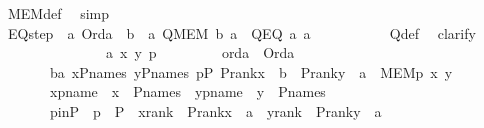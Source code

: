 \begin{isabellebody}
\ MEM{\isacharunderscore}{\kern0pt}def\ \isamarkupfalse%
\ simp\ \isanewline
\ \ \ \ \isamarkupfalse%
\isanewline
\isanewline
\ \ \ \ \isamarkupfalse%
\ EQ{\isacharunderscore}{\kern0pt}step\ {\isacharcolon}{\kern0pt}\ {\isachardoublequoteopen}{\isasymAnd}a{\isachardot}{\kern0pt}\ Ord{\isacharparenleft}{\kern0pt}a{\isacharparenright}{\kern0pt}\ {\isasymLongrightarrow}\ {\isasymforall}b\ {\isasymin}\ a{\isachardot}{\kern0pt}\ Q{\isacharparenleft}{\kern0pt}MEM{\isacharcomma}{\kern0pt}\ b{\isacharcomma}{\kern0pt}\ a{\isacharparenright}{\kern0pt}\ {\isasymLongrightarrow}\ Q{\isacharparenleft}{\kern0pt}EQ{\isacharcomma}{\kern0pt}\ a{\isacharcomma}{\kern0pt}\ a{\isacharparenright}{\kern0pt}{\isachardoublequoteclose}\ \ \ \isanewline
\ \ \ \ \ \ \isamarkupfalse%
\ Q{\isacharunderscore}{\kern0pt}def\ \isamarkupfalse%
\ clarify\ \isanewline
\ \ \ \ \isamarkupfalse%
\ {\isacharminus}{\kern0pt}\ \isanewline
\ \ \ \ \ \ \isamarkupfalse%
\ a\ x\ y\ p\ \isanewline
\ \ \ \ \ \ \isamarkupfalse%
\ orda\ {\isacharcolon}{\kern0pt}\ {\isachardoublequoteopen}Ord{\isacharparenleft}{\kern0pt}a{\isacharparenright}{\kern0pt}{\isachardoublequoteclose}\ \isanewline
\ \ \ \ \ \ \ {\isachardoublequoteopen}{\isasymforall}b{\isasymin}a{\isachardot}{\kern0pt}\ {\isasymforall}x{\isasymin}P{\isacharunderscore}{\kern0pt}names{\isachardot}{\kern0pt}\ {\isasymforall}y{\isasymin}P{\isacharunderscore}{\kern0pt}names{\isachardot}{\kern0pt}\ {\isasymforall}p{\isasymin}P{\isachardot}{\kern0pt}\ P{\isacharunderscore}{\kern0pt}rank{\isacharparenleft}{\kern0pt}x{\isacharparenright}{\kern0pt}\ {\isasymle}\ b\ {\isasymlongrightarrow}\ P{\isacharunderscore}{\kern0pt}rank{\isacharparenleft}{\kern0pt}y{\isacharparenright}{\kern0pt}\ {\isasymle}\ a\ {\isasymlongrightarrow}\ MEM{\isacharparenleft}{\kern0pt}p{\isacharcomma}{\kern0pt}\ x{\isacharcomma}{\kern0pt}\ y{\isacharparenright}{\kern0pt}{\isachardoublequoteclose}\ \isanewline
\ \ \ \ \ \ \ xpname\ {\isacharcolon}{\kern0pt}\ {\isachardoublequoteopen}x\ {\isasymin}\ P{\isacharunderscore}{\kern0pt}names{\isachardoublequoteclose}\ \ ypname\ {\isacharcolon}{\kern0pt}\ {\isachardoublequoteopen}y\ {\isasymin}\ P{\isacharunderscore}{\kern0pt}names{\isachardoublequoteclose}\ \isanewline
\ \ \ \ \ \ \ pinP\ {\isacharcolon}{\kern0pt}\ {\isachardoublequoteopen}p\ {\isasymin}\ P{\isachardoublequoteclose}\ \ xrank\ {\isacharcolon}{\kern0pt}\ {\isachardoublequoteopen}P{\isacharunderscore}{\kern0pt}rank{\isacharparenleft}{\kern0pt}x{\isacharparenright}{\kern0pt}\ {\isasymle}\ a{\isachardoublequoteclose}\ \ yrank\ {\isacharcolon}{\kern0pt}\ {\isachardoublequoteopen}P{\isacharunderscore}{\kern0pt}rank{\isacharparenleft}{\kern0pt}y{\isacharparenright}{\kern0pt}\ {\isasymle}\ a{\isachardoublequoteclose}\ \isanewline

\end{isabellebody}
